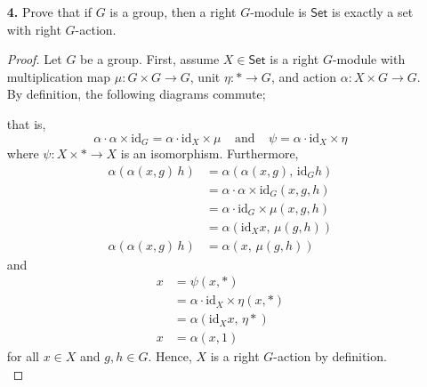 \documentclass[ 12pt ]{article}
\begin{document}
\begin{enumerate}
	\item[\textbf{4.}] Prove that if $G$ is a group, then a right $G$-module is $\mathsf{Set}$ is exactly a set with right $G$-action.

		\begin{proof}
			Let $G$ be a group. First, assume $X \in \mathsf{Set}$ is a right $G$-module with multiplication map $\mu : G \times G \to G$, unit $\eta : \ast \to G$, and action $\alpha : X \times G \to G$. By definition, the following diagrams commute;
			\begin{center}
			\end{center}
			that is, $$\alpha \cdot \alpha \times \mathrm{id}_G = \alpha \cdot \mathrm{id}_X \times \mu\;\;\;\; \mathrm{and}\;\;\;\; \psi = \alpha \cdot \mathrm{id}_X \times \eta$$ where $\psi : X \times \ast \to X$ is an isomorphism. Furthermore,
			\begin{align*}
				\alpha( \alpha(x, g)\, h) &= \alpha(\alpha(x, g),\, \mathrm{id}_G h) \\
				&= \alpha \cdot \alpha \times \mathrm{id}_G (x, g, h) \\
				&= \alpha \cdot \mathrm{id}_G \times \mu (x, g, h) \\
				&= \alpha (\mathrm{id}_X x,\, \mu(g, h)) \\
				\alpha( \alpha(x, g)\, h) &= \alpha (x,\, \mu(g, h))
			\end{align*}
			and
			\begin{align*}
				x &= \psi(x, \ast) \\
				&= \alpha \cdot \mathrm{id}_X \times \eta (x, \ast) \\
				&= \alpha (\mathrm{id}_X x,\, \eta \ast) \\
				x &= \alpha (x, 1)
			\end{align*}
			for all $x \in X$ and $g, h \in G$. Hence, $X$ is a right $G$-action by definition. \\


\end{proof}
\end{enumerate}
\end{document}
